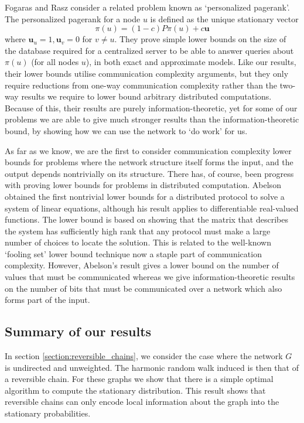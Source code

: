\documentclass[twocolumn]{article}
\begin{document}
Fogaras and Rasz \cite{fogaras04} consider a related problem known as `personalized pagerank'. The personalized pagerank for a node $u$ is defined as the unique stationary vector $$\pi(u) = (1-c) P \pi(u) + c \mathbf{u}$$ where $\mathbf{u}_u=1, \mathbf{u}_v=0$ for $v \neq u$. They prove simple lower bounds on the size of the database required for a centralized server to be able to answer queries about $\pi(u)$ (for all nodes $u$), in both exact and approximate models. Like our results, their lower bounds utilise communication complexity arguments, but they only require reductions from one-way communication complexity rather than the two-way results we require to lower bound arbitrary distributed computations. Because of this, their results are purely information-theoretic, yet for some of our problems we are able to give much stronger results than the information-theoretic bound, by showing how we can use the network to `do work' for us.

As far as we know, we are the first to consider communication complexity lower bounds for problems where the network structure itself forms the input, and the output depends nontrivially on its structure. There has, of course, been progress with proving lower bounds for problems in distributed computation. Abelson \cite{322200} obtained the first nontrivial lower bounds for a distributed protocol to solve a system of linear equations, although his result applies to differentiable real-valued functions. The lower bound is based on showing that the matrix that describes the system has sufficiently high rank that any protocol must make a large number of choices to locate the solution. This is related to the well-known `fooling set' lower bound technique now a staple part of communication complexity. However, Abelson's result gives a lower bound on the number of values that must be communicated whereas we give information-theoretic results on the number of bits that must be communicated over a network which also forms part of the input.

\subsection{Summary of our results}

In section \ref{section:reversible_chains}, we consider the case where the network $G$ is undirected and unweighted. The harmonic random walk induced is then that of a reversible chain. For these graphs we show that there is a simple optimal algorithm to
compute the stationary distribution. This result shows that reversible
chains can only encode local information about the graph into the
stationary probabilities.
\end{document}
